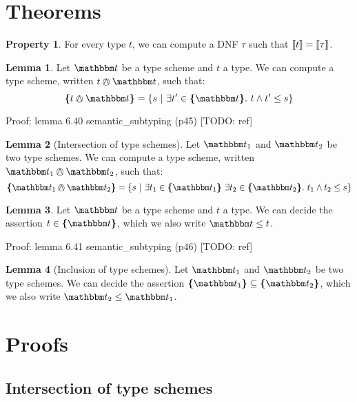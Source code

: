 \documentclass[a4paper]{article}
\theoremstyle{definition}
\newtheorem{lemma}{Lemma}
\newtheorem{property}{Property}
\begin{document}
    \section{Theorems}

    \begin{property}
      For every type $t$, we can compute a DNF $\tau$ such that ${\llbracket t \rrbracket} = {\llbracket \tau \rrbracket}$.
    \end{property}

    \begin{lemma}
      Let $\ts$ be a type scheme and $t$ a type. We can compute a type scheme, written $t \tsand \ts$, such that:
      \[\tsint {t \tsand \ts} = \{s \alt \exists t' \in \tsint \ts.\ t \land t' \leq s \}\]
    \end{lemma}
    Proof: lemma 6.40 semantic\_subtyping (p45) [TODO: ref]

    \begin{lemma}[Intersection of type schemes]
      Let $\ts_1$ and $\ts_2$ be two type schemes. We can compute a type scheme, written $\ts_1 \tsand \ts_2$, such that:
      \[\tsint {\ts_1 \tsand \ts_2} = \{s\alt \exists t_1 \in \tsint {\ts_1}\ 
      \exists t_2 \in \tsint {\ts_2}.\ {t_1} \land {t_2} \leq s\}\]
    \end{lemma}

    \begin{lemma}
      Let $\ts$ be a type scheme and $t$ a type. We can decide the assertion $t \in \tsint \ts$,
      which we also write $\ts \leq t$.
    \end{lemma}
    Proof: lemma 6.41 semantic\_subtyping (p46) [TODO: ref]

    \begin{lemma}[Inclusion of type schemes]
      Let $\ts_1$ and $\ts_2$ be two type schemes. We can decide the assertion $\tsint {\ts_1} \subseteq \tsint {\ts_2}$,
      which we also write $\ts_2 \leq \ts_1$.
    \end{lemma}

    \section{Proofs}

    \subsection{Intersection of type schemes}
\end{document}

